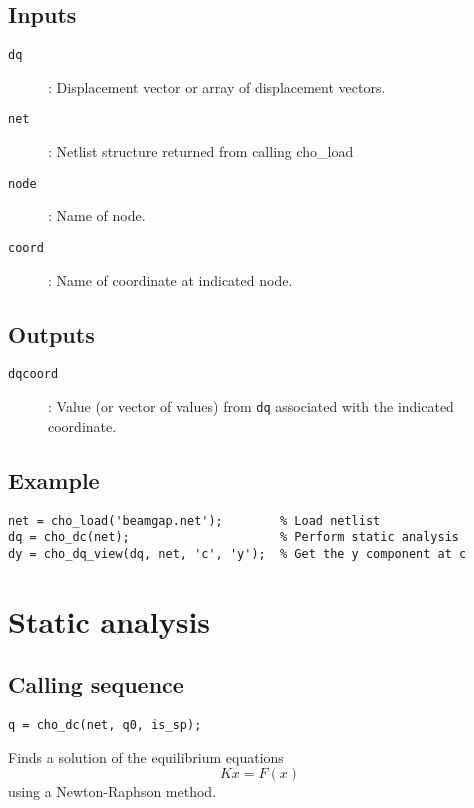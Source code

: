 \subsection*{Inputs}

\begin{description}
\item[\texttt{dq}]:    Displacement vector or array of displacement vectors.
\item[\texttt{net}]: 
  Netlist structure returned from calling cho\_load
\item[\texttt{node}]:  Name of node.
\item[\texttt{coord}]: Name of coordinate at indicated node.
\end{description}

\subsection*{Outputs}

\begin{description}
\item[\texttt{dqcoord}]: Value (or vector of values) from \texttt{dq}
   associated with the indicated coordinate.
\end{description}

\subsection*{Example}

\begin{verbatim}
net = cho_load('beamgap.net');        % Load netlist 
dq = cho_dc(net);                     % Perform static analysis
dy = cho_dq_view(dq, net, 'c', 'y');  % Get the y component at c
\end{verbatim}


\section{Static analysis}

\subsection*{Calling sequence}

\begin{verbatim}
q = cho_dc(net, q0, is_sp);
\end{verbatim}

Finds a solution of the equilibrium equations
\[
  Kx = F(x)
\]
using a Newton-Raphson method.

